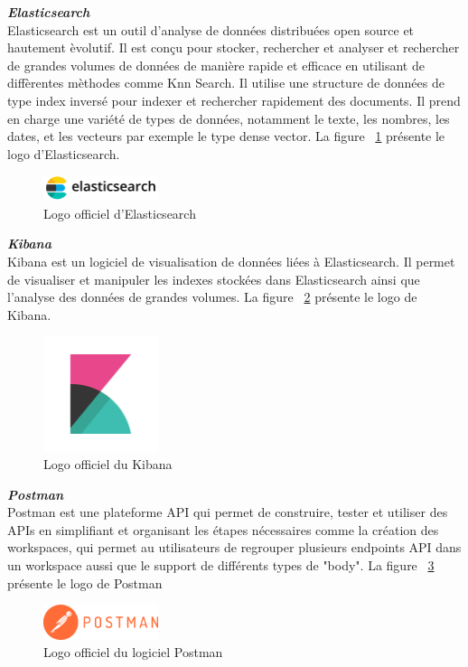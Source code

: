 \noindent
{\small\textbf{\textit{Elasticsearch}}}\mbox{}\\
Elasticsearch est un outil d'analyse de données distribuées open source et hautement èvolutif. Il est conçu pour stocker, rechercher et analyser et rechercher de grandes volumes de données de manière rapide et efficace en utilisant de diffèrentes mèthodes comme Knn Search.
Il utilise une structure de données de type index inversé pour indexer et rechercher rapidement des documents. Il prend en charge une variété de types de données, notamment le texte, les nombres, les dates, et les vecteurs par exemple le type dense vector.
La figure ~\ref{fig:elasticsearch} présente le logo d'Elasticsearch.
\begin{figure}[H]
\centering
\includegraphics[width=0.3\textwidth]{logos/elasticsearch.png}
\caption{Logo officiel d'Elasticsearch}
\label{fig:elasticsearch}
\end{figure}

\noindent
{\small\textbf{\textit{Kibana}}}\mbox{}\\
Kibana est un logiciel de visualisation de données liées à Elasticsearch. Il permet de visualiser et manipuler les indexes stockées dans Elasticsearch ainsi que l'analyse des données de grandes volumes.
La figure ~\ref{fig:kibana} présente le logo de Kibana.
\begin{figure}[H]
\centering
\includegraphics[width=0.3\textwidth]{logos/kibana.png}
\caption{Logo officiel du Kibana}
\label{fig:kibana}
\end{figure}

\noindent
{\small\textbf{\textit{Postman}}}\mbox{}\\
Postman est une plateforme API qui permet de construire, tester et utiliser des APIs en simplifiant et organisant les étapes nécessaires comme la création des workspaces, qui permet au utilisateurs de regrouper plusieurs endpoints API dans un workspace aussi que le support de différents types de "body". La figure ~\ref{fig:postman} présente le logo de Postman
\begin{figure}[H]
\centering
\includegraphics[width=0.3\textwidth]{logos/postman.png}
\caption{Logo officiel du logiciel Postman}
\label{fig:postman}
\end{figure}


